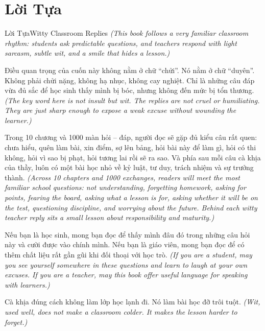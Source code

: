 \chapter*{Lời Tựa}

\begin{truyen}{Lời Tựa}{Witty Classroom Replies}
\textit{(This book follows a very familiar classroom rhythm: students ask predictable questions, and teachers respond with light sarcasm, subtle wit, and a smile that hides a lesson.)}

Điều quan trọng của cuốn này không nằm ở chữ ``chửi''. Nó nằm ở chữ ``duyên''. Không phải chửi nặng, không hạ nhục, không cay nghiệt. Chỉ là những câu đáp vừa đủ sắc để học sinh thấy mình bị bóc, nhưng không đến mức bị tổn thương.
\textit{(The key word here is not insult but wit. The replies are not cruel or humiliating. They are just sharp enough to expose a weak excuse without wounding the learner.)}

Trong 10 chương và 1000 màn hỏi -- đáp, người đọc sẽ gặp đủ kiểu câu rất quen: chưa hiểu, quên làm bài, xin điểm, sợ lên bảng, hỏi bài này để làm gì, hỏi có thi không, hỏi vì sao bị phạt, hỏi tương lai rồi sẽ ra sao. Và phía sau mỗi câu cà khịa của thầy, luôn có một bài học nhỏ về kỷ luật, tư duy, trách nhiệm và sự trưởng thành.
\textit{(Across 10 chapters and 1000 exchanges, readers will meet the most familiar school questions: not understanding, forgetting homework, asking for points, fearing the board, asking what a lesson is for, asking whether it will be on the test, questioning discipline, and worrying about the future. Behind each witty teacher reply sits a small lesson about responsibility and maturity.)}

Nếu bạn là học sinh, mong bạn đọc để thấy mình đâu đó trong những câu hỏi này và cười được vào chính mình. Nếu bạn là giáo viên, mong bạn đọc để có thêm chất liệu rất gần gũi khi đối thoại với học trò.
\textit{(If you are a student, may you see yourself somewhere in these questions and learn to laugh at your own excuses. If you are a teacher, may this book offer useful language for speaking with learners.)}
\end{truyen}

\begin{baihoc}
Cà khịa đúng cách không làm lớp học lạnh đi. Nó làm bài học đỡ trôi tuột.
\textit{(Wit, used well, does not make a classroom colder. It makes the lesson harder to forget.)}
\end{baihoc}

\ngancach